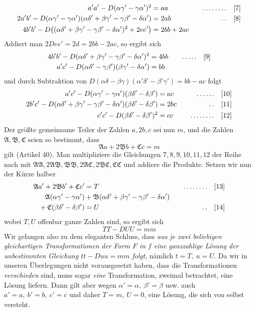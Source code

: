 \[
\begin{aligned}
a'a'-D(\alpha\gamma'-\gamma\alpha')^2&=aa&\quad\mathinner{.\,.\,.\,.\,.\,.\,.\,.}\quad&[7]\\
2a'b'-D(\alpha\gamma'-\gamma\alpha')(\alpha\delta'+\beta\gamma'-\gamma\beta'-\delta\alpha')&=2ab&\quad\mathinner{.\,.}\quad&[8]\\
4b'b'-D\bigl((\alpha\delta'+\beta\gamma'-\gamma\beta'-\delta\alpha')^2+2ee'\bigr)&=2bb+2ac
\end{aligned}
\]
Addiert man $2Dee'=2d=2bb-2ac$, so ergibt sich
\[
\begin{aligned}
4b'b'-D(\alpha\delta'+\beta\gamma'-\gamma\beta'-\delta\alpha')^2&=4bb&\quad\mathinner{.\,.\,.\,.\,.}\quad&[9]\\
a'c'-D(\alpha\delta'-\gamma\beta')(\beta\gamma'-\delta\alpha')&=bb
\end{aligned}
\]
und durch Subtraktion von $D(\alpha\delta-\beta\gamma)(\alpha'\delta'-\beta'\gamma')=bb-ac$ folgt
\[
\begin{aligned}
a'c'-D(\alpha\gamma'-\gamma\alpha')(\beta\delta'-\delta\beta')&=ac&\quad\mathinner{.\,.\,.\,.\,.\,.}\quad&[10]\\
2b'c'-D(\alpha\delta'+\beta\gamma'-\gamma\beta'-\delta\alpha')(\beta\delta'-\delta\beta')&=2bc&\quad\mathinner{.\,.}\quad&[11]\\
c'c'-D(\beta\delta'-\delta\beta')^2&=cc&\quad\mathinner{.\,.\,.\,.\,.\,.\,.\,.}\quad&[12]
\end{aligned}
\]
Der größte gemeinsame Teiler der Zahlen $a,2b,c$ sei nun $m$, und die Zahlen $\mathfrak{A},\mathfrak{B},\mathfrak{C}$ seien so bestimmt, dass
\[
\mathfrak{A}a+2\mathfrak{B}b+\mathfrak{C}c=m
\]
gilt (Artikel 40). Man multipliziere die Gleichungen $7,8,9,10,11,12$ der Reihe nach mit $\mathfrak{A}\mathfrak{A},\allowbreak 2\mathfrak{A}\mathfrak{B},\allowbreak \mathfrak{B}\mathfrak{B},\allowbreak 2\mathfrak{A}\mathfrak{C},\allowbreak 2\mathfrak{B}\mathfrak{C},\allowbreak \mathfrak{C}\mathfrak{C}$ und addiere die Produkte. Setzen wir nun der Kürze halber
\[
\begin{aligned}
\mathfrak{A}a'+2\mathfrak{B}b'+\mathfrak{C}c'&=T&\quad\mathinner{.\,.\,.\,.\,.\,.\,.\,.}\quad&[13]\\
\mathfrak{A}(\alpha\gamma'-\gamma\alpha')&+\mathfrak{B}(\alpha\delta'+\beta\gamma'-\gamma\beta'-\delta\alpha')&&\\
{}+\mathfrak{C}(\beta\delta'-\delta\beta')&=U&\quad\mathinner{.\,.}\quad&[14]
\end{aligned}
\]
wobei $T,U$ offenbar ganze Zahlen sind, so ergibt sich
\[
TT-DUU=mm
\]
Wir gelangen also zu dem eleganten Schluss, dass \textit{aus je zwei beliebigen gleichartigen Transformationen der Form $F$ in $f$ eine ganzzahlige Lösung der unbestimmten Gleichung $tt-Duu=mm$ folgt}, nämlich $t=T,\ u=U$. Da wir in
unseren Überlegungen nicht vorausgesetzt haben, dass die Transformationen \textit{verschieden} sind, muss sogar \textit{eine} Transformation, zweimal betrachtet, eine Lösung liefern. Dann gilt aber wegen $\alpha'=\alpha,\ \beta'=\beta$ usw. auch $a'=a,\ b'=b,\ c'=c$ und daher $T=m,\ U=0$, eine Lösung, die sich von selbst versteht.

